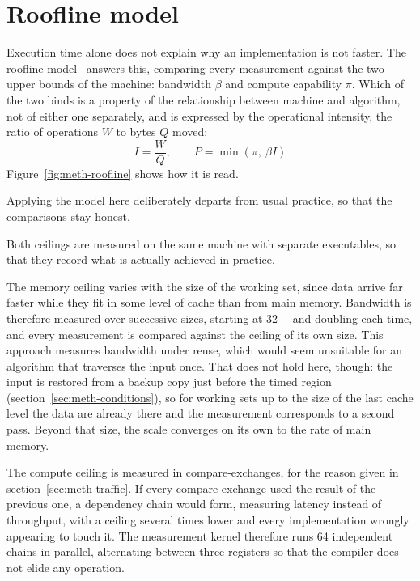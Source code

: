 \section{Roofline model}
\label{sec:meth-roofline}

Execution time alone does not explain why an implementation is not faster. The
roofline model~\cite{williams2009} answers this, comparing every measurement
against the two upper bounds of the machine: bandwidth $\beta$ and compute
capability $\pi$. Which of the two binds is a property of the relationship
between machine and algorithm, not of either one separately, and is expressed
by the operational intensity, the ratio of operations $W$ to bytes $Q$ moved:
\[ I = \frac{W}{Q}, \qquad P = \min(\pi,\ \beta I) \]
Figure~\ref{fig:meth-roofline} shows how it is read.



Applying the model here deliberately departs from usual practice, so that the
comparisons stay honest.

Both ceilings are measured on the same machine with separate executables, so
that they record what is actually achieved in practice.

The memory ceiling varies with the size of the working set, since data arrive
far faster while they fit in some level of cache than from main memory.
Bandwidth is therefore measured over successive sizes, starting at
\qty{32}{\kibi\byte} and doubling each time, and every measurement is compared
against the ceiling of its own size. This approach measures bandwidth under
reuse, which would seem unsuitable for an algorithm that traverses the input
once. That does not hold here, though: the input is restored from a backup copy
just before the timed region (section~\ref{sec:meth-conditions}), so for
working sets up to the size of the last cache level the data are already there
and the measurement corresponds to a second pass. Beyond that size, the scale
converges on its own to the rate of main memory.

The compute ceiling is measured in compare-exchanges, for the reason given in
section~\ref{sec:meth-traffic}. If every compare-exchange used the result of
the previous one, a dependency chain would form, measuring latency instead of
throughput, with a ceiling several times lower and every implementation wrongly
appearing to touch it. The measurement kernel therefore runs 64 independent
chains in parallel, alternating between three registers so that the compiler
does not elide any operation.

